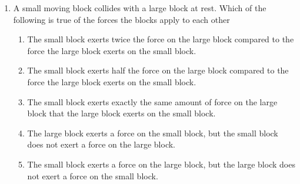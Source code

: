 \documentclass{../../oss-apphys}
\begin{document}
\begin{multicols}{2}
\begin{enumerate}[leftmargin=18pt]
%    
%    
  \item A small moving block collides with a large block at rest. Which of the
    following is true of the forces the blocks apply to each other
    \begin{enumerate}[noitemsep,topsep=0pt,leftmargin=18pt,label=(\Alph*)]
    \item The small block exerts twice the force on the large block
      compared to the force the large block exerts on the small block.
    \item The small block exerts half the force on the large block compared
      to the force the large block exerts on the small block.
    \item The small block exerts exactly the same amount of force on the
      large block that the large block exerts on the small block.
    \item The large block exerts a force on the small block, but the small
      block does not exert a force on the large block.
    \item The small block exerts a force on the large block, but the large
      block does not exert a force on the small block.
    \end{enumerate}
    \columnbreak
    
  \end{enumerate}
  

\end{multicols}
\end{document}
